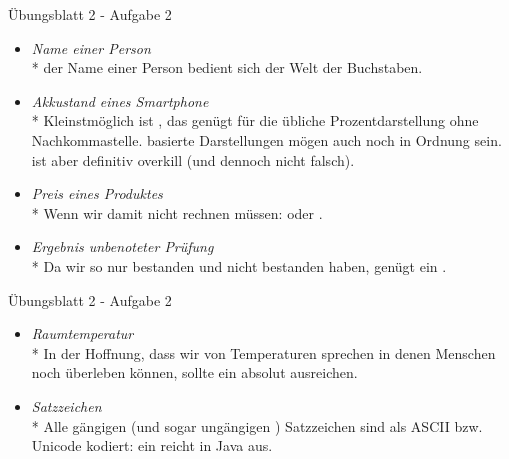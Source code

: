 \begin{frame}[t]{Übungsblatt 2 - Aufgabe 2}
    \begin{itemize}[<+(1)->]
        \itemsep6pt
        \item \textit{Name einer Person}\\*
            \pause{} der Name einer Person bedient sich der Welt der Buchstaben.
        \item \textit{Akkustand eines Smartphone}\\*
            \pause{}Kleinstmöglich ist , das genügt für die übliche Prozentdarstellung ohne Nachkommastelle.\pause{}  basierte Darstellungen mögen auch noch in Ordnung sein.  ist aber definitiv overkill (und dennoch nicht falsch).
        \item \textit{Preis eines Produktes}\\*
            \pause{}Wenn wir damit nicht rechnen müssen:  oder .
        \item \textit{Ergebnis unbenoteter Prüfung}\\*
            \pause{}Da wir so nur bestanden und nicht bestanden haben, genügt ein .
    \end{itemize}
\end{frame}

\begin{frame}[t]{Übungsblatt 2 - Aufgabe 2}
    \begin{itemize}[<+(1)->]
        \itemsep6pt
        \item \textit{Raumtemperatur}\\*
            \pause{}In der Hoffnung, dass wir von Temperaturen sprechen in denen Menschen noch überleben können, sollte ein  absolut ausreichen.
        \item \textit{Satzzeichen}\\*
            \pause{}Alle gängigen (und sogar ungängigen \Laughey) Satzzeichen sind als ASCII bzw. Unicode kodiert: ein  reicht in Java aus.
    \end{itemize}
\end{frame}


